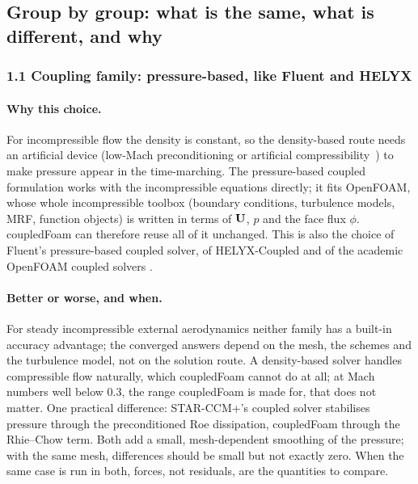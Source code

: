 \subsection{Group by group: what is the same, what is different, and why}
\label{sec:cmp-why}

\subsubsection*{1.1 Coupling family: pressure-based, like Fluent and HELYX}

\paragraph{Why this choice.} For incompressible flow the density is
constant, so the density-based route needs an artificial device (low-Mach
preconditioning or artificial compressibility~\cite{cmp-WeissSmith1995,
cmp-Economon2020}) to make pressure appear in the time-marching. The
pressure-based coupled formulation works with the incompressible equations
directly; it fits OpenFOAM, whose whole incompressible toolbox (boundary
conditions, turbulence models, MRF, function objects) is written in terms
of $\mathbf{U}$, $p$ and the face flux $\phi$. coupledFoam can therefore reuse all
of it unchanged. This is also the choice of Fluent's pressure-based coupled
solver, of HELYX-Coupled and of the academic OpenFOAM coupled solvers
\cite{Darwish2009,Mangani2014a,cmp-Jareteg2014}.

\paragraph{Better or worse, and when.} For steady incompressible external
aerodynamics neither family has a built-in accuracy advantage; the
converged answers depend on the mesh, the schemes and the turbulence model,
not on the solution route. A density-based solver handles compressible
flow naturally, which coupledFoam cannot do at all; at Mach numbers well
below 0.3, the range coupledFoam is made for, that does not matter. One practical
difference: STAR-CCM+'s coupled solver stabilises pressure through the
preconditioned Roe dissipation, coupledFoam through the Rhie--Chow term. Both
add a small, mesh-dependent smoothing of the pressure; with the same mesh,
differences should be small but not exactly zero. When the same case is
run in both, forces, not residuals, are the quantities to compare.

